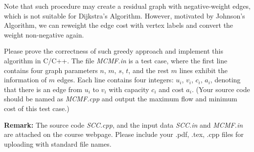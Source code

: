 \documentclass[12pt,a4paper]{article}
\theoremstyle{definition}
\begin{document}
\begin{enumerate}
Note that such procedure may create a residual graph with negative-weight edges, which is not suitable for Dijkstra's Algorithm. However, motivated by Johnson's Algorithm, we can reweight the edge cost with vertex labels and convert the weight non-negative again.

Please prove the correctness of such greedy approach and implement this algorithm in C/C++. The file \emph{MCMF.in} is a test case, where the first line contains four graph parameters $n$, $m$, $s$, $t$, and the rest $m$ lines exhibit the information of $m$ edges. Each line contains four integers: $u_i$, $v_i$, $c_i$, $a_i$, denoting that there is an edge from $u_i$ to $v_i$ with capacity $c_i$ and cost $a_i$. {\color{blue}(Your source code should be named as \emph{MCMF.cpp} and output the maximum flow and minimum cost of this test case.)}

\hspace{1cm}
\begin{minipage}[t]{0.45\textwidth}
\textbf{Remark:} The source code \emph{SCC.cpp}, and the input data \emph{SCC.in} and \emph{MCMF.in} are attached on the course webpage. Please include your .pdf, .tex, .cpp files for uploading with standard file names.
\end{minipage}

\end{enumerate}






\end{document}
